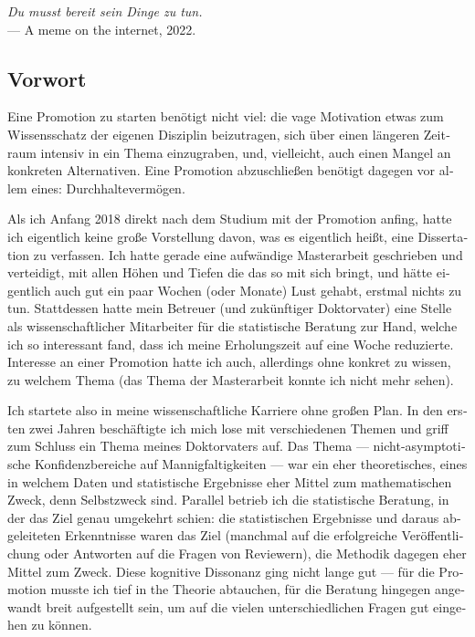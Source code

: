 
\begin{flushright}{\slshape
    Du musst bereit sein Dinge zu tun.} \\ \medskip
    --- A meme on the internet, 2022.
\end{flushright}



\bigskip

\begingroup
\let\clearpage\relax
\let\cleardoublepage\relax
\let\cleardoublepage\relax
\begin{otherlanguage}{ngerman}
\chapter*{Vorwort}
Eine Promotion zu starten benötigt nicht viel: die vage Motivation etwas zum Wissensschatz der eigenen Disziplin beizutragen, sich über einen längeren Zeitraum intensiv in ein Thema einzugraben, und, vielleicht, auch einen Mangel an konkreten Alternativen.
Eine Promotion abzuschließen benötigt dagegen vor allem eines: Durchhaltevermögen. 

Als ich Anfang 2018 direkt nach dem Studium mit der Promotion anfing, hatte ich eigentlich keine große Vorstellung davon, was es eigentlich heißt, eine Dissertation zu verfassen. Ich hatte gerade eine aufwändige Masterarbeit geschrieben und verteidigt, mit allen Höhen und Tiefen die das so mit sich bringt, und  hätte eigentlich auch gut ein paar Wochen (oder Monate) Lust gehabt, erstmal nichts zu tun. Stattdessen hatte mein Betreuer (und zukünftiger Doktorvater) eine Stelle als wissenschaftlicher Mitarbeiter für die statistische Beratung zur Hand, welche ich so interessant fand, dass ich meine Erholungszeit auf eine Woche reduzierte. Interesse an einer Promotion hatte ich auch, allerdings ohne konkret zu wissen, zu welchem Thema (das Thema der Masterarbeit konnte ich nicht mehr sehen). 

Ich startete also in meine wissenschaftliche Karriere ohne großen Plan. In den ersten zwei Jahren beschäftigte ich mich lose mit verschiedenen Themen und griff zum Schluss ein Thema meines Doktorvaters auf. Das Thema --- nicht-asymptotische Konfidenzbereiche auf Mannigfaltigkeiten --- war ein eher theoretisches, eines in welchem Daten und statistische Ergebnisse eher Mittel zum mathematischen Zweck, denn Selbstzweck sind. Parallel betrieb ich die statistische Beratung, in der das Ziel genau umgekehrt schien: die statistischen Ergebnisse und daraus abgeleiteten Erkenntnisse waren das Ziel (manchmal auf die erfolgreiche Veröffentlichung oder Antworten auf die Fragen von Reviewern), die Methodik dagegen eher Mittel zum Zweck. Diese kognitive Dissonanz ging nicht lange gut --- für die Promotion musste ich tief in the Theorie abtauchen, für die Beratung hingegen angewandt breit aufgestellt sein, um auf die vielen unterschiedlichen Fragen gut eingehen zu können. 


\end{otherlanguage}
